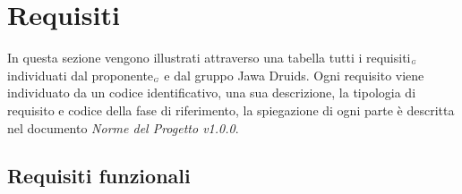 \chapter{Requisiti}\label{Requisiti}
In questa sezione vengono illustrati attraverso una tabella tutti i requisiti$_{\scaleto{G}{3pt}}$ individuati dal proponente$_{\scaleto{G}{3pt}}$ e dal gruppo Jawa Druids. Ogni requisito viene individuato da un codice identificativo, una sua descrizione, la tipologia di requisito e codice della fase di riferimento, la spiegazione di ogni parte è descritta nel documento \textit{Norme del Progetto v1.0.0}.
\section{Requisiti funzionali}\label{RequisitiFunzionali}



